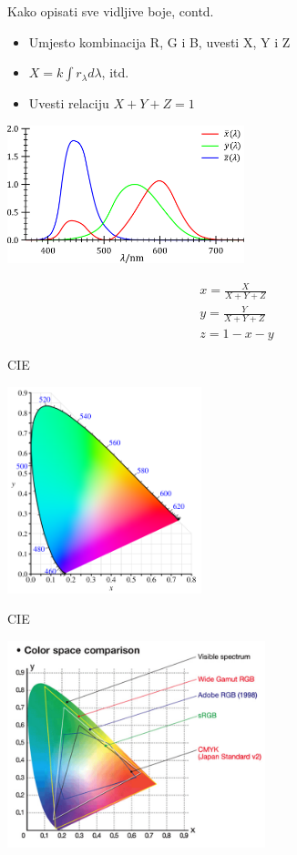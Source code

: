\documentclass[9pt]{beamer}
\begin{document}
\begin{frame}{Kako opisati sve vidljive boje, contd.}
	\begin{itemize}
		\item Umjesto kombinacija R, G i B, uvesti X, Y i Z
		\item $X = k \int r_{\lambda} d \lambda$, itd.
		\item Uvesti  relaciju $X + Y + Z = 1$
	\end{itemize}
	\begin{center}
		\includegraphics[height=4cm]{slike/CIE_1931_XYZ_Color_Matching_Functions.png}
	\end{center}
	\begin{align*}
	x = \frac{X}{X+Y+Z} \\
	y = \frac{Y}{X+Y+Z} \\
	z = 1-x-y
	\end{align*}
\end{frame}
\begin{frame}{CIE}
	\begin{center}
		\includegraphics[height=6cm]{slike/CIE1931xy_blank.png}
	\end{center}
\end{frame}

\begin{frame}{CIE}
	\begin{center}
		\includegraphics[height=6cm]{slike/cie_gamuts.jpg}
	\end{center}
\end{frame}
\end{document}
